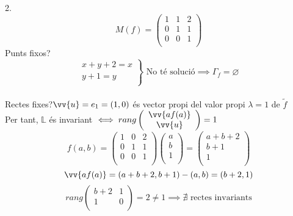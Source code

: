 \begin{exmp}2.
	\[M(f)=\left(\begin{array}{cc|c}
		1&1&2\\
		0&1&1\\ \hline
		0&0&1\\
	\end{array}\right)\]
	Punts fixos?
	\[\left.\begin{array}{r}x+y+2=x\\y+1=y\\\end{array}\right\}\text{ No té solució}\implies\Gamma_f=\varnothing\] \\
	Rectes fixes?$\vv{u}=e_1=(1,0)$ és vector propi del valor propi $\lambda=1$ de $\widetilde{f}$ \\
	Per tant, $\mathbb{L}$ és invariant $\iff rang\left(\begin{array}{c}\vv{af(a)}\\\vv{u}\\\end{array}\right)=1$ \\
	\[f(a,b)=\left(\begin{array}{cc|c}
		1&0&2\\
		0&1&1\\ \hline
		0&0&1\\
	\end{array}\right)\left(\begin{array}{c}a\\b\\1\\\end{array}\right)=\left(\begin{array}{c}a+b+2\\b+1\\1\\\end{array}\right)\]
	\[\vv{af(a)}=(a+b+2,b+1)-(a,b)=(b+2,1)\]
	\[rang\left(\begin{array}{cc}b+2&1\\1&0\\\end{array}\right)=2\neq 1\implies\nexists\text{ rectes invariants}\]
\end{exmp}

